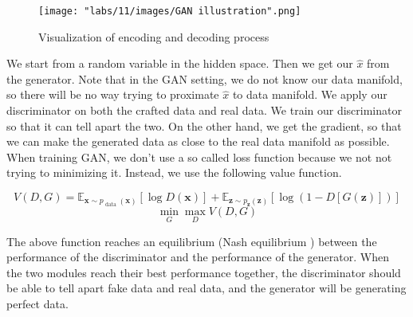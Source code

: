 \begin{figure}
    \centering
    \texttt{[image: "labs/11/images/GAN illustration".png]}
    \caption{Visualization of encoding and decoding process}
    \label{fig:my_label}
\end{figure}

We start from a random variable in the hidden space. Then we get our $\hat{x}$ from the generator. Note that in the GAN setting, we do not know our data manifold, so there will be no way trying to proximate $\hat{x}$ to data manifold. We apply our discriminator on both the crafted data and real data. We train our discriminator so that it can tell apart the two. On the other hand, we get the gradient, so that we can make the generated data as close to the real data manifold as possible. \\ 


When training GAN, we don't use a so called loss function because we not not trying to minimizing it. Instead, we use the following value function.

$$V(D, G)=\mathbb{E}_{\boldsymbol{x} \sim p_{\text { data }}(\boldsymbol{x})}[\log D(\boldsymbol{x})]+\mathbb{E}_{\boldsymbol{z} \sim p_{\boldsymbol{z}}(\boldsymbol{z})}[\log (1-D[G(\boldsymbol{z})])]$$
$$\min _{G} \max _{D} V(D, G)$$

The above function reaches an equilibrium (Nash equilibrium ) between the performance of the discriminator and the performance of the generator. When the two modules reach their best performance together, the discriminator should be able to tell apart fake data and real data, and the generator will be generating perfect data.